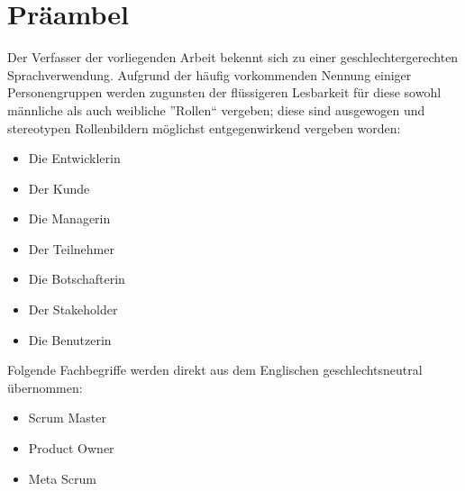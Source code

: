 \newpage
\chapter*{Präambel}

Der Verfasser der vorliegenden Arbeit bekennt sich zu einer geschlechtergerechten Sprachverwendung. Aufgrund der häufig vorkommenden Nennung einiger Personengruppen werden zugunsten der flüssigeren Lesbarkeit für diese sowohl männliche als auch weibliche ”Rollen“ vergeben; diese sind ausgewogen und stereotypen Rollenbildern möglichst entgegenwirkend vergeben worden:

\begin{itemize}
    \item Die Entwicklerin
    \item Der Kunde
    \item Die Managerin
    \item Der Teilnehmer
    \item Die Botschafterin
    \item Der Stakeholder
    \item Die Benutzerin
\end{itemize}

Folgende Fachbegriffe werden direkt aus dem Englischen geschlechtsneutral übernommen:

\begin{itemize}
    \item Scrum Master
    \item Product Owner
    \item Meta Scrum
\end{itemize}
